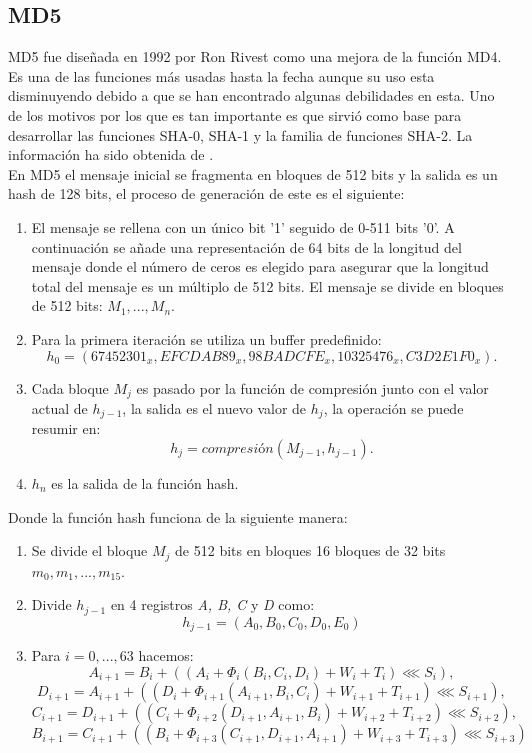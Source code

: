 \begin{aligned*}
\subsection{MD5}
MD5 fue diseñada en 1992 por Ron Rivest como una mejora de la función MD4. Es una de las funciones más usadas hasta la fecha aunque su uso esta disminuyendo debido a que se han encontrado algunas debilidades en esta. Uno de los motivos por los que es tan importante es que sirvió como base para desarrollar las funciones SHA-0, SHA-1 y la familia de funciones SHA-2.
La información ha sido obtenida de \cite{Wang2005}.\\
En MD5 el mensaje inicial se fragmenta en bloques de 512 bits y la salida es un hash de 128 bits, el proceso de generación de este es el siguiente:

\begin{enumerate}
	\item El mensaje se rellena con un único bit '1' seguido de 0-511 bits '0'. A continuación se añade una representación de 64 bits de la longitud del mensaje donde el número de ceros es elegido para asegurar que la longitud total del mensaje es un múltiplo de 512 bits. El mensaje se divide en bloques de 512 bits: $M_1,...,M_n$.
	\item Para la primera iteración se utiliza un buffer predefinido:
	$$
		h_0=(67452301_x, EFCDAB89_x, 98BADCFE_x, 10325476_x, C3D2E1F0_x).
	$$
	\item Cada bloque $M_j$ es pasado por la función de compresión junto con el valor actual de $h_{j-1}$, la salida es el nuevo valor de $h_j$, la operación se puede resumir en:
	$$
		h_j=compresión(M_{j-1},h_{j-1}).
	$$
	\item $h_n$ es la salida de la función hash.
\end{enumerate}
Donde la función hash funciona de la siguiente manera:
\begin{enumerate}
	\item Se divide el bloque $M_j$ de 512 bits en bloques 16 bloques de 32 bits $m_0,m_1,...,m_{15}$. 
\item Divide $h_{j-1}$ en 4 registros \emph{A, B, C} y \emph{D} como:
	$$
		h_{j-1} = (A_0, B_0, C_0, D_0, E_0)
	$$
	\item Para $i=0,...,63$ hacemos:
	$$
		A_{i+1}=B_i+((A_i+\Phi_i(B_i,C_i,D_i)+W_i+T_i)\lll S_i),
	$$
	$$
		D_{i+1}=A_{i+1}+((D_i+\Phi_{i+1}(A_{i+1},B_i,C_i)+W_{i+1}+T_{i+1})\lll S_{i+1}),
	$$
	$$
		C_{i+1}=D_{i+1}+((C_i+\Phi_{i+2}(D_{i+1},A_{i+1},B_i)+W_{i+2}+T_{i+2})\lll S_{i+2}),
	$$
	$$
		B_{i+1}=C_{i+1}+((B_i+\Phi_{i+3}(C_{i+1},D_{i+1},A_{i+1})+W_{i+3}+T_{i+3})\lll S_{i+3})
$$
\end{enumerate}
\end{aligned*}
